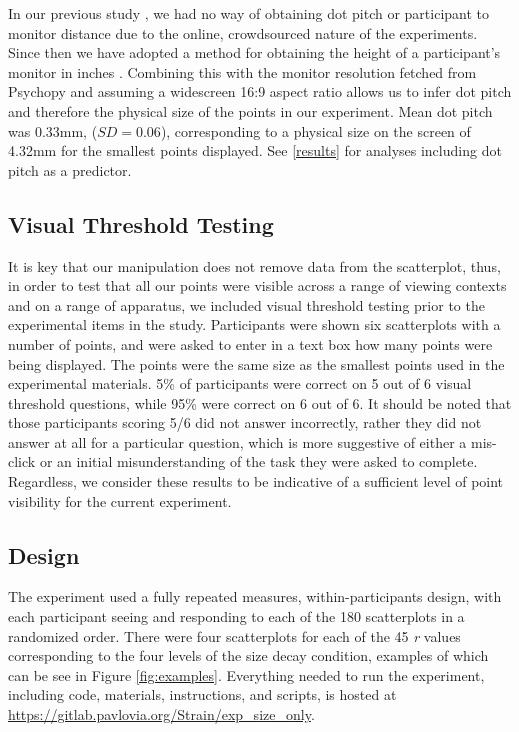 \documentclass{vgtc}                          %
\begin{document}
In our previous study \cite{strain_2023}, we had no way of obtaining dot pitch
or participant to monitor distance due to the online, crowdsourced nature of the
experiments. Since then we have adopted a method for obtaining the height of a
participant's monitor in inches \cite{screenscale}. Combining this with the
monitor resolution fetched from Psychopy and assuming a widescreen 16:9 aspect ratio
allows us to infer dot pitch and therefore the physical size of the points in our
experiment. Mean dot pitch was 0.33mm, (\(SD = 0.06\)),
corresponding to a physical size on the screen of 4.32mm
for the smallest points displayed. See \autoref{results} for analyses including dot pitch as a predictor.

\hypertarget{visual-threshold-testing}{%
\subsection{Visual Threshold Testing}\label{visual-threshold-testing}}

It is key that our manipulation does not remove data from the scatterplot,
thus, in order to test that all our points were visible across a range of viewing
contexts and on a range of apparatus, we included visual threshold testing prior
to the experimental items in the study. Participants were shown six scatterplots
with a number of points, and were asked to enter in a text box how many points
were being displayed. The points were the same size as the smallest points used
in the experimental materials. 5\% of
participants were correct on 5 out of 6 visual
threshold questions, while 95\% were correct
on 6 out of 6. It should be noted that those
participants scoring 5/6 did not answer incorrectly, rather they did not answer
at all for a particular question, which is more suggestive of either
a mis-click or an initial misunderstanding of the task they were asked to complete.
Regardless, we consider these results to be indicative of a sufficient level of
point visibility for the current experiment.

\hypertarget{design}{%
\subsection{Design}\label{design}}

The experiment used a fully repeated measures, within-participants design, with each
participant seeing and responding to each of the 180 scatterplots in a randomized order.
There were four scatterplots for each of the 45 \emph{r} values corresponding to the
four levels of the size decay condition, examples of which can be see in Figure \ref{fig:examples}.
Everything needed to run the experiment, including code, materials, instructions, and scripts, is
hosted at \url{https://gitlab.pavlovia.org/Strain/exp_size_only}.
\end{document}
